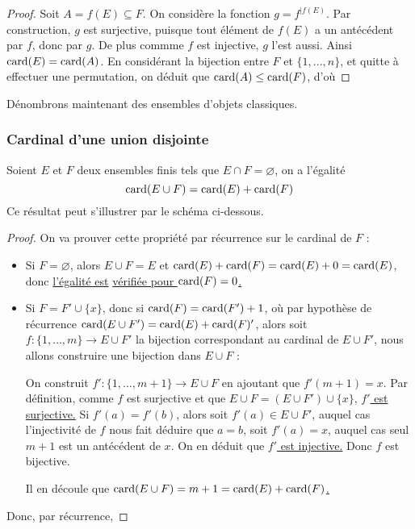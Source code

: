 \begin{proof}
    Soit $A = f(E)\subseteq F$. On considère la fonction $g = f^{|f(E)}$. Par construction, $g$ est surjective, puisque tout élément de $f(E)$ a un antécédent par $f$, donc par $g$. De plus commme $f$ est injective, $g$ l'est aussi. Ainsi $\mathrm{card}(E) = \mathrm{card}(A)$. En considérant la bijection entre $F$ et $\{1,\ldots,n\}$, et quitte à effectuer une permutation, on déduit que $\mathrm{card}(A) \leq \mathrm{card}(F)$, d'où 
\end{proof}

Dénombrons maintenant des ensembles d'objets classiques.

\subsubsection{Cardinal d'une union disjointe}

\begin{prop}
    Soient $E$ et $F$ deux ensembles finis tels que $E\cap F = \varnothing$, on a l'égalité $$\mathrm{card}(E\cup F)=\mathrm{card}(E) + \mathrm{card}(F)$$ Ce résultat peut s'illustrer par le schéma ci-dessous.
\end{prop}


\begin{proof}
    On va prouver cette propriété par récurrence sur le cardinal de $F$ :
    \begin{itemize}[label=$\bullet$]
        \item Si $F=\varnothing$, alors $E\cup F = E$ et $\mathrm{card}(E) + \mathrm{card}(F) = \mathrm{card}(E) + 0 = \mathrm{card}(E)$, donc \underline{l'égalité est} \underline{vérifiée pour $\mathrm{card}(F) = 0$.}
        \item Si $F=F' \cup \{x\}$, donc si $\mathrm{card}(F) = \mathrm{card}(F') + 1$, où par hypothèse de récurrence $\mathrm{card}(E\cup F')=\mathrm{card}(E) + \mathrm{card}(F)'$, alors soit $f : \{1,\ldots,m\} \to E\cup F'$ la bijection correspondant au cardinal de $E\cup F'$, nous allons construire une bijection dans $E\cup F$ :
        
        On construit $f' : \{1,\ldots,m+1\}\to E\cup F$ en ajoutant que $f'(m+1)=x$. Par définition, comme $f$ est surjective et que $E\cup F=(E\cup F')\cup \{x\}$, \underline{$f'$ est surjective.} Si $f'(a)=f'(b)$, alors soit $f'(a)\in E\cup F'$, auquel cas l'injectivité de $f$ nous fait déduire que $a=b$, soit $f'(a)=x$, auquel cas seul $m+1$ est un antécédent de $x$. On en déduit que \underline{$f'$ est injective.} Donc $f$ est bijective.
        
        Il en découle que \underline{$\mathrm{card}(E\cup F)=m+1=\mathrm{card}(E) + \mathrm{card}(F)$.}
    \end{itemize}
    
    Donc, par récurrence, 
\end{proof}

